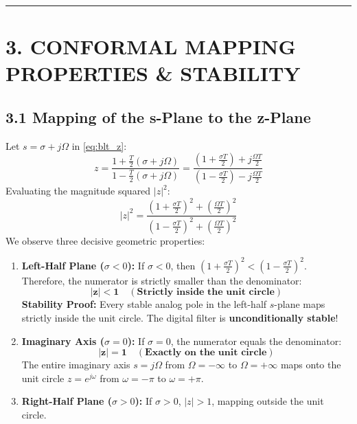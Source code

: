 \documentclass[11pt,a4paper]{article}
\begin{document}
\noindent\rule{\textwidth}{0.5pt}

\section{3. CONFORMAL MAPPING PROPERTIES \& STABILITY}

\subsection{3.1 Mapping of the s-Plane to the z-Plane}
Let $s = \sigma + j\Omega$ in \eqref{eq:blt_z}:
\begin{equation}
z = \frac{1 + \frac{T}{2}(\sigma + j\Omega)}{1 - \frac{T}{2}(\sigma + j\Omega)} = \frac{\left(1 + \frac{\sigma T}{2}\right) + j \frac{\Omega T}{2}}{\left(1 - \frac{\sigma T}{2}\right) - j \frac{\Omega T}{2}}
\end{equation}
Evaluating the magnitude squared $|z|^2$:
\begin{equation}
|z|^2 = \frac{\left(1 + \frac{\sigma T}{2}\right)^2 + \left(\frac{\Omega T}{2}\right)^2}{\left(1 - \frac{\sigma T}{2}\right)^2 + \left(\frac{\Omega T}{2}\right)^2}
\end{equation}
We observe three decisive geometric properties:
\begin{enumerate}
    \item \textbf{Left-Half Plane ($\sigma < 0$):} If $\sigma < 0$, then $\left(1 + \frac{\sigma T}{2}\right)^2 < \left(1 - \frac{\sigma T}{2}\right)^2$. Therefore, the numerator is strictly smaller than the denominator:
    \begin{equation}
    \mathbf{|z| < 1 \quad (\text{Strictly inside the unit circle})}
    \end{equation}
    \textbf{Stability Proof:} Every stable analog pole in the left-half $s$-plane maps strictly inside the unit circle. The digital filter is \textbf{unconditionally stable}!
    
    \item \textbf{Imaginary Axis ($\sigma = 0$):} If $\sigma = 0$, the numerator equals the denominator:
    \begin{equation}
    \mathbf{|z| = 1 \quad (\text{Exactly on the unit circle})}
    \end{equation}
    The entire imaginary axis $s = j\Omega$ from $\Omega = -\infty$ to $\Omega = +\infty$ maps onto the unit circle $z = e^{j\omega}$ from $\omega = -\pi$ to $\omega = +\pi$.
    
    \item \textbf{Right-Half Plane ($\sigma > 0$):} If $\sigma > 0$, $|z| > 1$, mapping outside the unit circle.
\end{enumerate}
\end{document}
